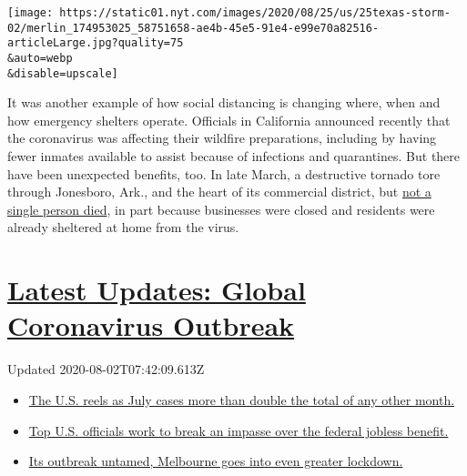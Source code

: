 \texttt{[image: https://static01.nyt.com/images/2020/08/25/us/25texas-storm-02/merlin\_174953025\_58751658-ae4b-45e5-91e4-e99e70a82516-articleLarge.jpg?quality=75\\\&auto=webp\\\&disable=upscale]}

It was another example of how social distancing is changing where, when
and how emergency shelters operate. Officials in California announced
recently that the coronavirus was affecting their wildfire preparations,
including by having fewer inmates available to assist because of
infections and quarantines. But there have been unexpected benefits,
too. In late March, a destructive tornado tore through Jonesboro, Ark.,
and the heart of its commercial district, but
\href{https://www.nytimes.com/2020/03/29/us/tornado-coronavirus-arkansas.html}{not
a single person died}, in part because businesses were closed and
residents were already sheltered at home from the virus.

\hypertarget{latest-updates-global-coronavirus-outbreak}{%
\section{\texorpdfstring{\href{https://www.nytimes.com/2020/08/01/world/coronavirus-covid-19.html?action=click\&pgtype=Article\&state=default\&region=MAIN_CONTENT_1\&context=storylines_live_updates}{Latest
Updates: Global Coronavirus
Outbreak}}{Latest Updates: Global Coronavirus Outbreak}}\label{latest-updates-global-coronavirus-outbreak}}

Updated 2020-08-02T07:42:09.613Z

\begin{itemize}
\tightlist
\item
  \href{https://www.nytimes.com/2020/08/01/world/coronavirus-covid-19.html?action=click\&pgtype=Article\&state=default\&region=MAIN_CONTENT_1\&context=storylines_live_updates\#link-34047410}{The
  U.S. reels as July cases more than double the total of any other
  month.}
\item
  \href{https://www.nytimes.com/2020/08/01/world/coronavirus-covid-19.html?action=click\&pgtype=Article\&state=default\&region=MAIN_CONTENT_1\&context=storylines_live_updates\#link-780ec966}{Top
  U.S. officials work to break an impasse over the federal jobless
  benefit.}
\item
  \href{https://www.nytimes.com/2020/08/01/world/coronavirus-covid-19.html?action=click\&pgtype=Article\&state=default\&region=MAIN_CONTENT_1\&context=storylines_live_updates\#link-2bc8948}{Its
  outbreak untamed, Melbourne goes into even greater lockdown.}
\end{itemize}

